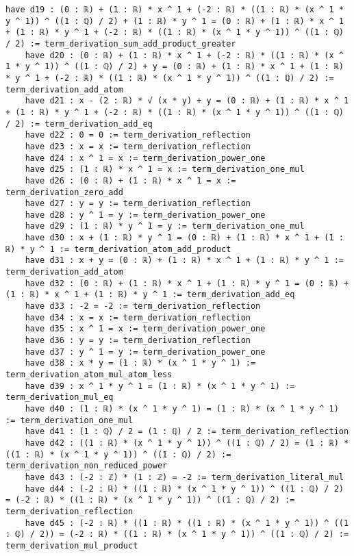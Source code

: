 \documentclass{article}
\begin{document}
\begin{tcolorbox}[colback=white!10, width=\linewidth]
\begin{lstlisting}[language=Lean4]
    have d19 : (0 : ℝ) + (1 : ℝ) * x ^ 1 + (-2 : ℝ) * ((1 : ℝ) * (x ^ 1 * y ^ 1)) ^ ((1 : ℚ) / 2) + (1 : ℝ) * y ^ 1 = (0 : ℝ) + (1 : ℝ) * x ^ 1 + (1 : ℝ) * y ^ 1 + (-2 : ℝ) * ((1 : ℝ) * (x ^ 1 * y ^ 1)) ^ ((1 : ℚ) / 2) := term_derivation_sum_add_product_greater
    have d20 : (0 : ℝ) + (1 : ℝ) * x ^ 1 + (-2 : ℝ) * ((1 : ℝ) * (x ^ 1 * y ^ 1)) ^ ((1 : ℚ) / 2) + y = (0 : ℝ) + (1 : ℝ) * x ^ 1 + (1 : ℝ) * y ^ 1 + (-2 : ℝ) * ((1 : ℝ) * (x ^ 1 * y ^ 1)) ^ ((1 : ℚ) / 2) := term_derivation_add_atom
    have d21 : x - (2 : ℝ) * √ (x * y) + y = (0 : ℝ) + (1 : ℝ) * x ^ 1 + (1 : ℝ) * y ^ 1 + (-2 : ℝ) * ((1 : ℝ) * (x ^ 1 * y ^ 1)) ^ ((1 : ℚ) / 2) := term_derivation_add_eq
    have d22 : 0 = 0 := term_derivation_reflection
    have d23 : x = x := term_derivation_reflection
    have d24 : x ^ 1 = x := term_derivation_power_one
    have d25 : (1 : ℝ) * x ^ 1 = x := term_derivation_one_mul
    have d26 : (0 : ℝ) + (1 : ℝ) * x ^ 1 = x := term_derivation_zero_add
    have d27 : y = y := term_derivation_reflection
    have d28 : y ^ 1 = y := term_derivation_power_one
    have d29 : (1 : ℝ) * y ^ 1 = y := term_derivation_one_mul
    have d30 : x + (1 : ℝ) * y ^ 1 = (0 : ℝ) + (1 : ℝ) * x ^ 1 + (1 : ℝ) * y ^ 1 := term_derivation_atom_add_product
    have d31 : x + y = (0 : ℝ) + (1 : ℝ) * x ^ 1 + (1 : ℝ) * y ^ 1 := term_derivation_add_atom
    have d32 : (0 : ℝ) + (1 : ℝ) * x ^ 1 + (1 : ℝ) * y ^ 1 = (0 : ℝ) + (1 : ℝ) * x ^ 1 + (1 : ℝ) * y ^ 1 := term_derivation_add_eq
    have d33 : -2 = -2 := term_derivation_reflection
    have d34 : x = x := term_derivation_reflection
    have d35 : x ^ 1 = x := term_derivation_power_one
    have d36 : y = y := term_derivation_reflection
    have d37 : y ^ 1 = y := term_derivation_power_one
    have d38 : x * y = (1 : ℝ) * (x ^ 1 * y ^ 1) := term_derivation_atom_mul_atom_less
    have d39 : x ^ 1 * y ^ 1 = (1 : ℝ) * (x ^ 1 * y ^ 1) := term_derivation_mul_eq
    have d40 : (1 : ℝ) * (x ^ 1 * y ^ 1) = (1 : ℝ) * (x ^ 1 * y ^ 1) := term_derivation_one_mul
    have d41 : (1 : ℚ) / 2 = (1 : ℚ) / 2 := term_derivation_reflection
    have d42 : ((1 : ℝ) * (x ^ 1 * y ^ 1)) ^ ((1 : ℚ) / 2) = (1 : ℝ) * ((1 : ℝ) * (x ^ 1 * y ^ 1)) ^ ((1 : ℚ) / 2) := term_derivation_non_reduced_power
    have d43 : (-2 : ℤ) * (1 : ℤ) = -2 := term_derivation_literal_mul
    have d44 : (-2 : ℝ) * ((1 : ℝ) * (x ^ 1 * y ^ 1)) ^ ((1 : ℚ) / 2) = (-2 : ℝ) * ((1 : ℝ) * (x ^ 1 * y ^ 1)) ^ ((1 : ℚ) / 2) := term_derivation_reflection
    have d45 : (-2 : ℝ) * ((1 : ℝ) * ((1 : ℝ) * (x ^ 1 * y ^ 1)) ^ ((1 : ℚ) / 2)) = (-2 : ℝ) * ((1 : ℝ) * (x ^ 1 * y ^ 1)) ^ ((1 : ℚ) / 2) := term_derivation_mul_product

\end{lstlisting}
\end{tcolorbox}
\end{document}
